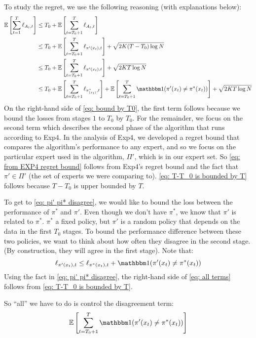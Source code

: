 \documentclass[11pt]{article}
\begin{document}
To study the regret, we use the following reasoning (with explanations below):
\begin{align}
\E{\sum_{t=1}^T\ell_{A_t,t}} &\le T_0 +\E{\sum_{t=T_0+1}^T\ell_{A_t,t}}\label{eq: bound by T0}\\
& \le T_0 + \E{\sum_{t=T_0+1}^T\ell_{\pi'(x_t),t}}+ \sqrt{2K(T-T_0) \log{N}} \label{eq: from EXP4 regret bound}\\
& \le T_0 + \E{\sum_{t=T_0+1}^T\ell_{\pi'(x_t),t}}+  \sqrt{2KT\log{N}}\label{eq: T-T_0 is bounded by T}\\
&\le T_0 + \E{\sum_{t=T_0+1}^T \ell_{\pi^*_{(x_t)},t}} + \E{\sum_{t=T_0+1}^T{\ind(\pi'(x_t)\neq \pi^*(x_t))}} + \sqrt{2KT\log{N}}
\label{eq: all terms}
\end{align}
On the right-hand side of \eqref{eq: bound by T0}, the first term follows because we bound the losses from stages $1$ to $T_0$ by $T_0$. For the remainder, we focus on the second term which describes the second phase of the algorithm that runs according to Exp4. In the analysis of Exp4, we developed a regret bound that compares the algorithm's performance to any expert, and so we focus on the particular expert used in the algorithm, $\Pi'$, which is in our expert set. So \eqref{eq: from EXP4 regret bound} follows from Exp4's regret bound and the fact that $\pi' \in \Pi'$ (the set of experts we were comparing to). \eqref{eq: T-T_0 is bounded by T} follows because $T-T_0$ is upper bounded by $T$. 

To get to \eqref{eq: pi' pi* disagree}, we would like to bound the loss between the performance of $\pi^*$ and $\pi'$. Even though we don't have $\pi^*$, we know that $\pi'$ is related to $\pi^*$. $\pi^*$ a fixed policy, but $\pi'$ is a random policy that depends on the data in the first $T_0$ stages. To bound the performance difference between these two policies, we want to think about how often they disagree in the second stage. (By construction, they will agree in the first stage). Note that:
\begin{equation}
\ell_{\pi'(x_t),t}\le \ell_{\pi^*(x_t),t} + \ind(\pi'(x_t)\neq \pi^*(x_t))\label{eq: pi' pi* disagree}
\end{equation}
Using the fact in \eqref{eq: pi' pi* disagree}, the right-hand side of \eqref{eq: all terms} follows from \eqref{eq: T-T_0 is bounded by T}. 

So ``all'' we have to do is control the disagreement term:
\begin{equation}
\E{\sum_{t=T_0+1}^T\ind(\pi'(x_t)\neq \pi^*(x_t))} \label{eq: disagreement term}
\end{equation}
\end{document}
